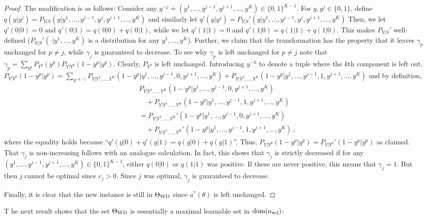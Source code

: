 \begin{proof}
	The modification is as follows:
	Consider any $y^{-j} \doteq (y^1,\dots,y^{j-1},y^{j+1},\dots,y^K)\in \{0,1\}^{K-1}$.
	For $y,y^j\in \{0,1\}$, define 
	$q(y|y^j) = P_{Y|S}(y|y^1, \dots, y^{j-1}, y^j, y^{j+1},\dots, y^K)$
	and similarly let
	$q'(y|y^j) = P_{Y|S}'(y|y^1, \dots, y^{j-1}, y^j, y^{j+1},\dots, y^K)$
	Then, we let $q'(0|0) = 0$ and $q'(0|1) = q(0|0) + q(0|1)$,
	while we let  $q'(1|1) = 0$ and $q'(1|0) = q(1|1) + q(1|0)$.
	This makes $P_{Y|S}'$ well-defined ($P_{Y|S}'(\cdot|y^1,\dots,y^K)$ is a distribution for any $y^1,\dots,y^K$).
	Further, we claim that the transformation has the property that 
	it leaves $\gamma_p$ unchanged for $p\ne j$, while $\gamma_j$ is guaranteed to decrease.
	To see why $\gamma_p$ is left unchanged for $p\ne j$ note that
	$\gamma_p = \sum_{y^p}  P_{Y^p}(y^p) P_{Y|Y^p}(1-y^p|y^p)$.
	Clearly, $P_{Y^p}$ is left unchanged.
	Introducing $y^{-k}$ to denote a tuple where the $k$th component is left out,
	$P_{Y|Y^p}(1-y^p|y^p) = \sum_{y^{-p,-j}} P_{Y|Y^1,\dots,Y^K}( 1-y^p | y^1,\dots, y^{j-1}, 0, y^{j+1}, \dots, y^K )
	+P_{Y|Y^1,\dots,Y^K}( 1-y^p | y^1,\dots, y^{j-1}, 1, y^{j+1}, \dots, y^K )$
	and by definition,
	\begin{align*}
	& P_{Y|Y^1,\dots,Y^K}( 1-y^p | y^1,\dots, y^{j-1}, 0, y^{j+1}, \dots, y^K )\\
	&\quad +P_{Y|Y^1,\dots,Y^K}( 1-y^p | y^1,\dots, y^{j-1}, 1, y^{j+1}, \dots, y^K )\\
	&
	=
	P_{Y|Y^1,\dots,Y^K}'( 1-y^p | y^1,\dots, y^{j-1}, 0, y^{j+1}, \dots, y^K )\\
	&\quad+P_{Y|Y^1,\dots,Y^K}'( 1-y^p | y^1,\dots, y^{j-1}, 1, y^{j+1}, \dots, y^K )\,,
	\end{align*}
	where the equality holds because ``$q'(y|0)+q'(y|1) = q(y|0) + q(y|1)$''.
	Thus, $P_{Y|Y^p}(1-y^p|y^p) = P_{Y|Y^p}'(1-y^p|y^p)$ as claimed.
	That $\gamma_j$ is non-increasing follows with an analogue calculation.
	In fact, this shows that $\gamma_j$ is strictly decreased
	if for any $(y^1,\dots,y^{j-1},y^{j+1},\dots,y^K)\in \{0,1\}^{K-1}$, either $q(0|0)$ or $q(1|1)$ was positive.
	If these are never positive, this means that $\gamma_j=1$. 
	But then $j$ cannot be optimal since $c_j>0$.
	Since $j$ was optimal, $\gamma_j$ is guaranteed to decrease.
	
	Finally, it is clear that the new instance is still in $\Theta_{\mathrm{WD}}$ since  $a^*(\theta)$ is left unchanged.
\end{proof}
T
he next result shows that
the set $\Theta_{\mathrm{WD}}$ is essentially a maximal learnable set in $\mathrm{dom}(a_{\mathrm{wd}})$:

